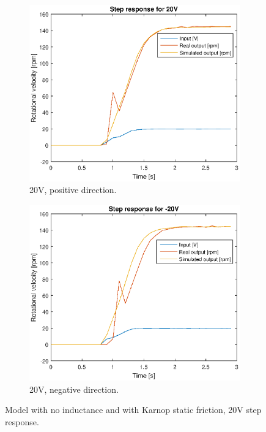\begin{figure}[H]
    \centering
    \begin{subfigure}[H]{0.48\textwidth}
    \includegraphics[width=\textwidth]{./img/testrig_20Vstep_no_i_fric.eps}
    \caption{20V, positive direction.}
    \label{fig:step202}
    \end{subfigure}
    \begin{subfigure}[H]{0.48\textwidth}
    \includegraphics[width=\textwidth]{./img/testrig_m20Vstep_no_i_fric.eps}
    \caption{20V, negative direction.}
    \label{fig:stepm202}
    \end{subfigure}
    \caption{Model with no inductance and with Karnop static friction, 20V step response.}
\end{figure}

